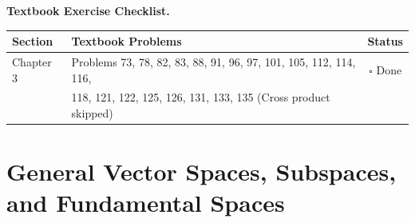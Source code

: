 \documentclass{natsirt}
\newenvironment{reviewbox}[1][]{\begin{whitebox}[#1]\textbf{Textbook Exercise Checklist. }}{\end{whitebox}}
\begin{document}
\begin{reviewbox}
    \begin{center}
    \begin{tabular}{|l|l|c|}
        \hline
        \textbf{Section} & \textbf{Textbook Problems} & \textbf{Status} \\
        \hline
        Chapter 3 & Problems 73, 78, 82, 83, 88, 91, 96, 97, 101, 105, 112, 114, 116, & $\square$ Done \\
                  & 118, 121, 122, 125, 126, 131, 133, 135 (Cross product skipped) & \\
        \hline
    \end{tabular}
    \end{center}
\end{reviewbox}


\section{General Vector Spaces, Subspaces, and Fundamental Spaces}
\end{document}
